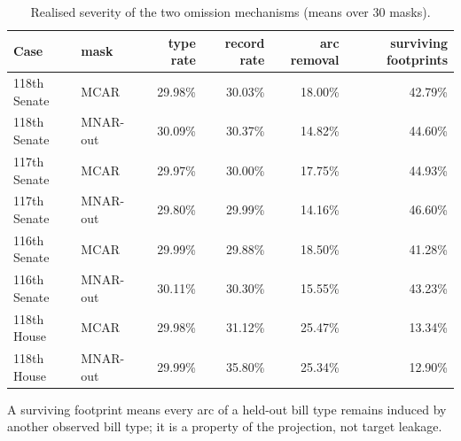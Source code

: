 \begin{table}[tbp]
\centering
\small
\caption{Realised severity of the two omission mechanisms (means over 30 masks).}
\label{tab:mask-realisation}
\begin{tabular}{llrrrr}
\toprule
Case & mask & type rate & record rate & arc removal & surviving footprints \\
\midrule
118th Senate & MCAR & 29.98\% & 30.03\% & 18.00\% & 42.79\% \\
118th Senate & MNAR-out & 30.09\% & 30.37\% & 14.82\% & 44.60\% \\
117th Senate & MCAR & 29.97\% & 30.00\% & 17.75\% & 44.93\% \\
117th Senate & MNAR-out & 29.80\% & 29.99\% & 14.16\% & 46.60\% \\
116th Senate & MCAR & 29.99\% & 29.88\% & 18.50\% & 41.28\% \\
116th Senate & MNAR-out & 30.11\% & 30.30\% & 15.55\% & 43.23\% \\
118th House & MCAR & 29.98\% & 31.12\% & 25.47\% & 13.34\% \\
118th House & MNAR-out & 29.99\% & 35.80\% & 25.34\% & 12.90\% \\
\bottomrule
\end{tabular}
\par\vspace{2pt}\footnotesize A surviving footprint means every arc of a held-out bill type remains induced by another observed bill type; it is a property of the projection, not target leakage.
\end{table}